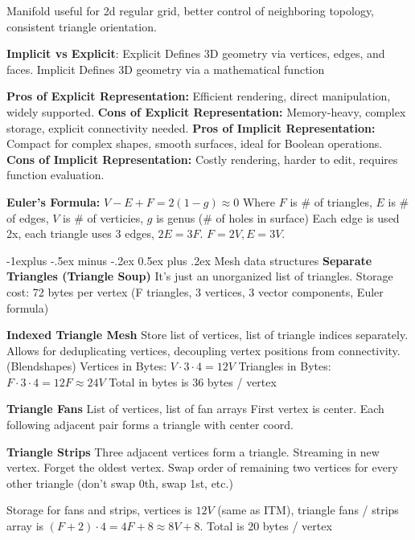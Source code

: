 \documentclass[letterpaper, 8pt]{extarticle}
\makeatletter
\renewcommand{\subsection}{\@startsection{subsection}{2}{0mm}%
                                {-1explus -.5ex minus -.2ex}%
                                {0.5ex plus .2ex}%
                                {\normalfont\tiny\bfseries}}
\makeatother
\begin{document}
\begin{multicols*}{4}
Manifold useful for 2d regular grid,
better control of neighboring topology,
consistent triangle orientation.

\textbf{Implicit vs Explicit}: Explicit Defines 3D geometry via vertices, edges, and faces. Implicit Defines 3D geometry via a mathematical function

\textbf{Pros of Explicit Representation:} Efficient rendering, direct manipulation, widely supported.
\textbf{Cons of Explicit Representation:} Memory-heavy, complex storage, explicit connectivity needed.
\textbf{Pros of Implicit Representation:} Compact for complex shapes, smooth surfaces, ideal for Boolean operations.
\textbf{Cons of Implicit Representation:} Costly rendering, harder to edit, requires function evaluation.

\textbf{Euler's Formula:} $V - E + F = 2(1 - g) \approx 0$
Where $F$ is \# of triangles,
$E$ is \# of edges,
$V$ is \# of verticies,
$g$ is genus (\# of holes in surface)
Each edge is used 2x, each triangle uses 3 edges, $2E = 3F$.
$F = 2V, E = 3V$.

\subsection{Mesh data structures}
\textbf{Separate Triangles (Triangle Soup)}
It's just an unorganized list of triangles.
Storage cost: 72 bytes per vertex
(F triangles, 3 vertices, 3 vector components, Euler formula)

\textbf{Indexed Triangle Mesh}
Store list of vertices, list of triangle indices separately.
Allows for deduplicating vertices, decoupling vertex positions from connectivity. (Blendshapes)
Vertices in Bytes: $V \cdot 3 \cdot 4 = 12 V$
Triangles in Bytes: $F \cdot 3 \cdot 4 = 12 F \approx 24 V$
Total in bytes is 36 bytes / vertex

\textbf{Triangle Fans}
List of vertices, list of fan arrays
First vertex is center. Each following adjacent pair forms a triangle with center coord.

\textbf{Triangle Strips}
Three adjacent vertices form a triangle.
Streaming in new vertex.
Forget the oldest vertex.
Swap order of remaining two vertices for every other triangle (don't swap 0th, swap 1st, etc.)

Storage for fans and strips, vertices is $12 V$ (same as ITM),
triangle fans / strips array is $(F + 2) \cdot 4 = 4F + 8 \approx 8V + 8$.
Total is 20 bytes / vertex


\end{multicols*}
\end{document}
